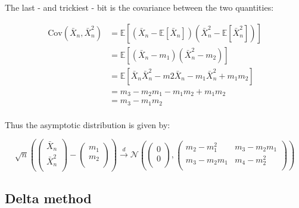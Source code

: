 \documentclass{report}
\begin{document}
The last - and trickiest - bit is the covariance between the two quantities:

\begin{equation}\label{eq:ex-lst-clt-proof-4}
    \begin{aligned}
        \text{Cov}\left(\bar{X}_n, \bar{X}_n^2\right)
          &= \mathbb{E}\left[\left(\bar{X}_n - \mathbb{E}\left[\bar{X}_n\right]\right)\left(\bar{X}_n^2 - \mathbb{E}\left[\bar{X}_n^2\right]\right)\right] \\
          &= \mathbb{E}\left[\left(\bar{X}_n - m_1\right)\left(\bar{X}_n^2 - m_2\right)\right] \\
          &= \mathbb{E}\left[\bar{X}_n\bar{X}_n^2 - m2\bar{X}_n - m_1\bar{X}_n^2 + m_1m_2\right] \\
          &= m_3 - m_2m_1 - m_1m_2 + m_1m_2 \\
          &= m_3 - m_1m_2 \\
    \end{aligned}
\end{equation}

Thus the asymptotic distribution is given by:

\begin{equation}\label{eq:ex-lst-clt-proof-5}
    \sqrt{n} \left(\begin{pmatrix}
        \bar{X}_n \\
        \bar{X}_n^2 \\
    \end{pmatrix} - \begin{pmatrix}
        m_1 \\
        m_2 \\
    \end{pmatrix}\right) \overset{d}{\to} \mathcal{N}\left(\begin{pmatrix}
        0 \\
        0 \\
    \end{pmatrix}, \begin{pmatrix}
        m_2 - m_1^2 & m_3 - m_2m_1 \\
        m_3 - m_2m_1 & m_4 - m_2^2 \\
    \end{pmatrix}\right)
\end{equation}

\subsection{Delta method}
\end{document}
